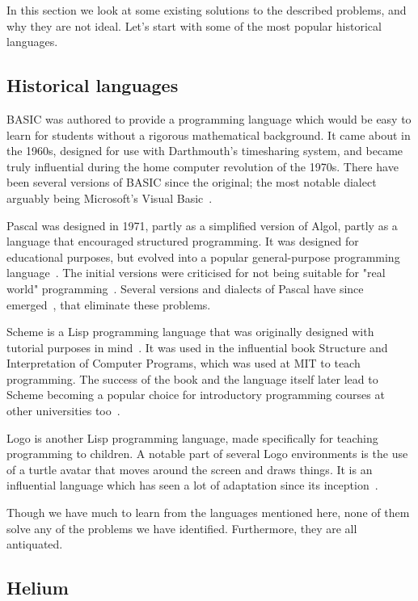 In this section we look at some existing solutions to the described problems,
and why they are not ideal. Let's start with some of the most popular
historical languages.

\subsection{Historical languages}

BASIC was authored to provide a programming language which would be easy to
learn for students without a rigorous mathematical background. It came about in
the 1960s, designed for use with Darthmouth's timesharing system, and became
truly influential during the home computer revolution of the 1970s. There have
been several versions of BASIC since the original; the most notable dialect
arguably being Microsoft's Visual Basic~\cite{time2014basic}.

Pascal was designed in 1971, partly as a simplified version of Algol, partly as
a language that encouraged structured programming. It was designed for
educational purposes, but evolved into a popular general-purpose programming
language~\cite{cantu2008essential}. The initial versions were criticised for
not being suitable for "real world" programming~\cite{kernighan1981pascal}. 
Several versions and dialects of Pascal have since
emerged~\cite{cantu2008essential}, that eliminate these problems.

Scheme is a Lisp programming language that was originally designed with
tutorial purposes in mind~\cite{sussman1998scheme}. It was used in the
influential book Structure and Interpretation of Computer Programs, which was
used at MIT to teach programming. The success of the book and the language
itself later lead to Scheme becoming a popular choice for introductory
programming courses at other universities too~\cite{felleisen2004structure}.

Logo is another Lisp programming language, made specifically for teaching
programming to children. A notable part of several Logo environments is the use
of a turtle avatar that moves around the screen and draws things. It is an
influential language which has seen a lot of adaptation since its
inception~\cite{logo2011whatislogo}.

Though we have much to learn from the languages mentioned here, none of them
solve any of the problems we have identified. Furthermore, they are all 
antiquated.

\subsection{Helium}

